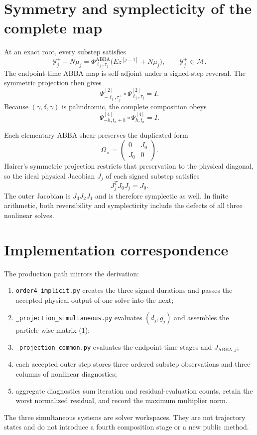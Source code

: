 \documentclass[11pt,a4paper]{article}
\newcommand{\Id}{I}
\newcommand{\Y}{\mathcal{Y}}
\newcommand{\M}{\mathcal{M}}
\newcommand{\Om}{\Omega_{\times}}
\newcommand{\PhiAB}{\Phi^{\mathrm{ABBA}}}
\newcommand{\PsiTwo}{\Psi^{[2]}}
\newcommand{\PsiFour}{\Psi^{[4]}}
\begin{document}
\section{Symmetry and symplecticity of the complete map}

At an exact root, every substep satisfies
\[
 \Y_j^+-N\mu_j
 =\PhiAB_{\ell_j,\tau_j}
  \bigl(Ez^{[j-1]}+N\mu_j\bigr),
 \qquad
 \Y_j^+\in\M.
\]
The endpoint-time ABBA map is self-adjoint under a signed-step reversal.  The
symmetric projection then gives
\[
 \PsiTwo_{-\ell_j,\tau_j^+}
 \circ\PsiTwo_{\ell_j,\tau_j}=\Id.
\]
Because $(\gamma,\delta,\gamma)$ is palindromic, the complete composition obeys
\[
 \PsiFour_{-h,t_n+h}\circ\PsiFour_{h,t_n}=\Id.
\]

Each elementary ABBA shear preserves the duplicated form
\[
 \Om=\begin{pmatrix}0&J_0\\J_0&0\end{pmatrix}.
\]
Hairer's symmetric projection restricts that preservation to the physical
diagonal, so the ideal physical Jacobian $J_j$ of each signed substep satisfies
\[
 J_j^TJ_0J_j=J_0.
\]
The outer Jacobian is $J_3J_2J_1$ and is therefore symplectic as well.  In
finite arithmetic, both reversibility and symplecticity include the defects of
all three nonlinear solves.

\section{Implementation correspondence}

The production path mirrors the derivation:
\begin{enumerate}
 \item \texttt{order4\_implicit.py} creates the three signed durations and
       passes the accepted physical output of one solve into the next;
 \item \texttt{\_projection\_simultaneous.py} evaluates $(d_j,g_j)$ and
       assembles the particle-wise matrix (1);
 \item \texttt{\_projection\_common.py} evaluates the endpoint-time stages and
       $J_{\mathrm{ABBA},j}$;
 \item each accepted outer step stores three ordered substep observations and
       three columns of nonlinear diagnostics;
 \item aggregate diagnostics sum iteration and residual-evaluation counts,
       retain the worst normalized residual, and record the maximum multiplier
       norm.
\end{enumerate}

The three simultaneous systems are solver workspaces.  They are not trajectory
states and do not introduce a fourth composition stage or a new public method.
\end{document}
